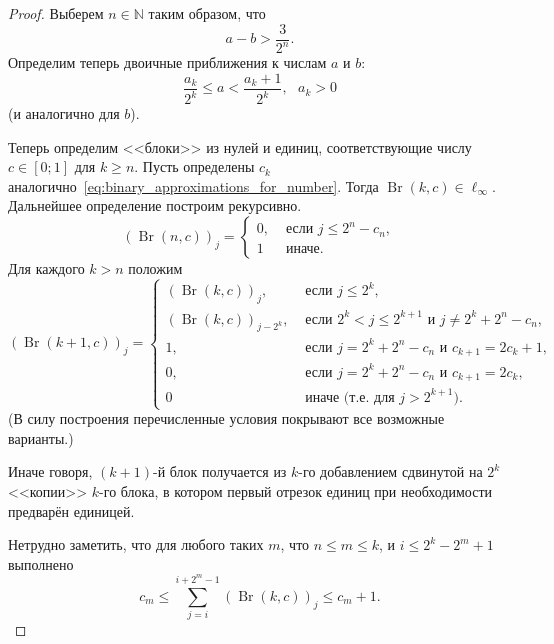 \documentclass[a4paper,14pt]{article} %
\theoremstyle{plain}
\begin{document}
\begin{proof}
	Выберем $n\in\mathbb{N}$ таким образом, что
	\begin{equation}
		\label{eq:Omega_a_b_gap}
		a - b > \frac{3}{2^n}
		.
	\end{equation}
	Определим теперь двоичные приближения к числам $a$ и $b$:
	\begin{equation}
		\label{eq:binary_approximations_for_number}
		\frac{a_k}{2^k} \leq a < \frac{a_k+1}{2^k}
		,
		~~~a_k>0
	\end{equation}
	(и аналогично для $b$).


	Теперь определим <<блоки>> из нулей и единиц, соответствующие числу $c\in[0;1]$ для $k \geq n$.
	Пусть определены $c_k$ аналогично~\eqref{eq:binary_approximations_for_number}.
	Тогда $\operatorname{Br}(k,c) \in \ell_\infty$.
	Дальнейшее определение построим рекурсивно.
	\begin{equation}
		(\operatorname{Br}(n,c))_j = \begin{cases}
			0, & \mbox{~если~} j \leq 2^n - c_n,
			\\
			1  & \mbox{~иначе}
			.
		\end{cases}
	\end{equation}
	Для каждого $k > n$ положим
	\begin{equation}
		(\operatorname{Br}(k+1,c))_j = \begin{cases}
			(\operatorname{Br}(k,c))_j, &  \mbox{~если~} j \leq 2^k,
			\\
			(\operatorname{Br}(k,c))_{j-2^k}, &  \mbox{~если~} 2^k < j \leq 2^{k+1} \mbox{~и~} j \neq 2^k + 2^n - c_n,
			\\
			1, & \mbox{~если~} j = 2^k + 2^n - c_n \mbox{~и~} c_{k+1} = 2 c_k + 1,
			\\
			0, & \mbox{~если~} j = 2^k + 2^n - c_n \mbox{~и~} c_{k+1} = 2 c_k,
			\\
			0  & \mbox{~иначе (т.е. для $j > 2^{k+1}$)}
			.
		\end{cases}
	\end{equation}
	(В силу построения перечисленные условия покрывают все возможные варианты.)

	Иначе говоря, $(k+1)$-й блок получается из $k$-го добавлением сдвинутой на $2^k$ <<копии>> $k$-го блока,
	в котором первый отрезок единиц при необходимости предварён единицей.

	Нетрудно заметить, что для любого таких $m$, что $n \leq m \leq k$, и $ i \leq 2^k - 2^m + 1$
	выполнено
	\begin{equation}
		c_m \leq \sum_{j=i}^{i+2^m-1} (\operatorname{Br}(k,c))_j \leq c_{m}+1
		.
	\end{equation}



\end{proof}
\end{document}
